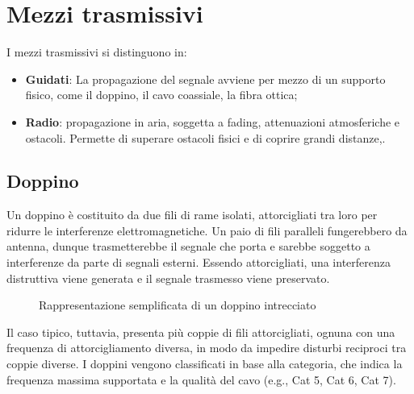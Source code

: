\section{Mezzi trasmissivi}
I mezzi trasmissivi si distinguono in:
\begin{itemize}
\item \textbf{Guidati}: La propagazione del segnale avviene per mezzo di un supporto fisico, come il doppino, il cavo coassiale, la fibra ottica;
\item \textbf{Radio}: propagazione in aria, soggetta a fading, attenuazioni atmosferiche e ostacoli. Permette di superare ostacoli fisici e di coprire grandi distanze,.
\end{itemize}
\subsection{Doppino}
Un doppino è costituito da due fili di rame isolati, attorcigliati tra loro per ridurre le interferenze elettromagnetiche.
Un paio di fili paralleli fungerebbero da antenna, dunque trasmetterebbe il segnale che porta e sarebbe soggetto a interferenze da parte di segnali esterni.
Essendo attorcigliati, una interferenza distruttiva viene generata e il segnale trasmesso viene preservato.
\begin{figure}[H]
\centering
{}
\caption{Rappresentazione semplificata di un doppino intrecciato}
\end{figure}
Il caso tipico, tuttavia, presenta più coppie di fili attorcigliati, ognuna con una frequenza di attorcigliamento diversa, in modo da impedire disturbi reciproci tra coppie diverse.
I doppini vengono classificati in base alla categoria, che indica la frequenza massima supportata e la qualità del cavo (e.g., Cat 5, Cat 6, Cat 7).
